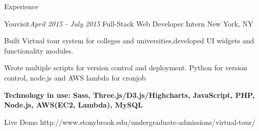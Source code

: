 \documentclass{resume} %
\begin{document}
\begin{rSection}{Experience}
\begin{rSubsection}{Youvisit}{\em April 2015 - July 2015 }{Full-Stack Web Developer Intern}{ New York, NY}
\item Built Virtual tour system for colleges and universities,developed UI widgets and functionality modules.
\item Wrote multiple scripts for version control and deployment. Python for version control, node.js and AWS lambda for cronjob
\item {\bf Technology in use: Sass, Three.js/D3.js/Highcharts, JavaScript, PHP, Node.js, AWS(EC2, Lambda), MySQL}

\item Live Demo http://www.stonybrook.edu/undergraduate-admissions/virtual-tour/
\end{rSubsection}



\end{rSection}
\end{document}
